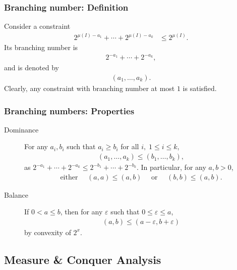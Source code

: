\begin{frame}
 \frametitle{Branching number: Definition}
 
 \lecturenotes{\medskip}
 \noindent
 Consider a constraint
\begin{align*}
 2^{\mu(I)-a_1} + \cdots + 2^{\mu(I)-a_k} & \leq 2^{\mu(I)}.
\end{align*}
Its \alert{branching number} is
\begin{align*}
 2^{-a_1} + \cdots + 2^{-a_k},
\end{align*}
and is denoted by
\begin{align*}
 \left(a_1, \ldots, a_k\right).
\end{align*}
Clearly, any constraint with branching number at most $1$ is satisfied.
\end{frame}

\begin{frame}
 \frametitle{Branching numbers: Properties}
 
\begin{description}
 \item[Dominance] For any $a_i, b_i$ such that $a_i \ge b_i$ for all $i, \; 1 \le i \le k$,
  \begin{align*}
   \left(a_1, \ldots, a_k\right) \le \left(b_1, \ldots, b_k\right),
  \end{align*}
  as $2^{-a_1}+\cdots+2^{-a_k} \le 2^{-b_1}+\cdots+2^{-b_k}$. \newline
  In particular, for any $a,b > 0$,
  \begin{align*}
   \text{either } \quad \left(a,a\right) \le \left(a,b\right) \quad \text{ or } \quad \left(b,b\right) \le \left(a,b\right).
  \end{align*}
 \item[Balance] If $0 < a \le b$, then for any $\varepsilon$ such that $0 \le \varepsilon \le a$,
  \begin{align*}
   \left( a,b \right) \le \left( a - \varepsilon, b + \varepsilon \right)
  \end{align*}
  by convexity of $2^x$.
\end{description}
\end{frame}


\subsection{Measure \& Conquer Analysis}

